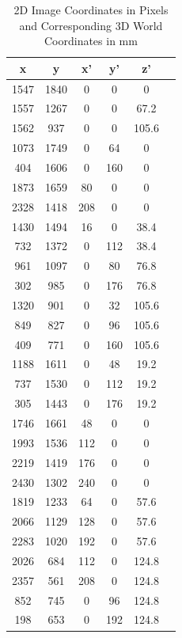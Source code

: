 \documentclass{article}
\begin{document}
\begin{table}[H]
    \centering
    \begin{tabular}{|c|c|c|c|c|c|}
    \hline
    \textbf{x} & \textbf{y} & \textbf{x'} & \textbf{y'} & \textbf{z'} \\
    \hline
    1547 & 1840 & 0   & 0   & 0     \\
    1557 & 1267 & 0   & 0   & 67.2  \\
    1562 & 937  & 0   & 0   & 105.6 \\
    1073 & 1749 & 0   & 64  & 0     \\
    404  & 1606 & 0   & 160 & 0     \\
    1873 & 1659 & 80  & 0   & 0     \\
    2328 & 1418 & 208 & 0   & 0     \\
    1430 & 1494 & 16  & 0   & 38.4  \\
    732  & 1372 & 0   & 112 & 38.4  \\
    961  & 1097 & 0   & 80  & 76.8  \\
    302  & 985  & 0   & 176 & 76.8  \\
    1320 & 901  & 0   & 32  & 105.6 \\
    849  & 827  & 0   & 96  & 105.6 \\
    409  & 771  & 0   & 160 & 105.6 \\
    1188 & 1611 & 0   & 48  & 19.2  \\
    737  & 1530 & 0   & 112 & 19.2  \\
    305  & 1443 & 0   & 176 & 19.2  \\
    1746 & 1661 & 48  & 0   & 0     \\
    1993 & 1536 & 112 & 0   & 0     \\
    2219 & 1419 & 176 & 0   & 0     \\
    2430 & 1302 & 240 & 0   & 0     \\
    1819 & 1233 & 64  & 0   & 57.6  \\
    2066 & 1129 & 128 & 0   & 57.6  \\
    2283 & 1020 & 192 & 0   & 57.6  \\
    2026 & 684  & 112 & 0   & 124.8 \\
    2357 & 561  & 208 & 0   & 124.8 \\
    852  & 745  & 0   & 96  & 124.8 \\
    198  & 653  & 0   & 192 & 124.8 \\
    \hline
    \end{tabular}
    \caption{2D Image Coordinates in Pixels and Corresponding 3D World Coordinates in mm}
    \end{table}
\end{document}
